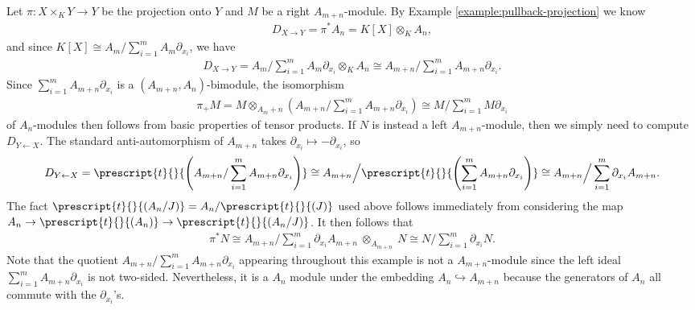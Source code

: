 \begin{example}\label{example:pushforward-projection}
	Let $\pi:X\times_K Y\to Y$ be the projection onto $Y$ and $M$ be a right $A_{m+n}$-module. By Example \ref{example:pullback-projection} we know
	\begin{align*}
		D_{X\to Y} = \pi^*A_n = K[X]\otimes_K A_n,
	\end{align*}
	and since $K[X] \cong A_m/\sum_{i=1}^m A_m\partial_{x_i}$, we have
	\begin{align*}
		D_{X\to Y} = A_m\Big/\sum_{i=1}^m A_m\partial_{x_i} \otimes_K A_n \cong A_{m+n}\Big/ \sum_{i=1}^{m} A_{m+n}\partial_{x_i}.
	\end{align*}
	Since $\sum_{i=1}^{m} A_{m+n}\partial_{x_i}$ is a $(A_{m+n}, A_n)$-bimodule, the isomorphism
	\begin{align*}
		\pi_+M = M\otimes_{A_m+n} \left(A_{m+n}\Big/ \sum_{i=1}^{m} A_{m+n}\partial_{x_i}\right) \cong M\Big/\sum_{i=1}^m M\partial_{x_i}
	\end{align*}
	of $A_n$-modules then follows from basic properties of tensor products. If $N$ is instead a left $A_{m+n}$-module, then we simply need to compute $D_{Y\leftarrow X}$. The standard anti-automorphism of $A_{m+n}$ takes $\partial_{x_i}\mapsto -\partial_{x_i}$, so
	\begin{align*}
		D_{Y\leftarrow X} = \prescript{t}{}{\left(A_{m+n}/ \sum_{i=1}^{m} A_{m+n}\partial_{x_i}\right)} \cong A_{m+n}\Big/\prescript{t}{}{\left(\sum_{i=1}^{m} A_{m+n}\partial_{x_i}\right)} \cong A_{m+n}\Big/\sum_{i=1}^{m} \partial_{x_i}A_{m+n}.
	\end{align*}
	The fact $\prescript{t}{}{(A_n/J)} = A_n/\prescript{t}{}{(J)}$ used above follows immediately from considering the map $A_n\to \prescript{t}{}{(A_n)}\to \prescript{t}{}{(A_n/J)}$. It then follows that
	\begin{align*}
		\pi^*N \cong A_{m+n}\Big/\sum_{i=1}^{m} \partial_{x_i}A_{m+n}~\otimes_{A_{m+n}} ~N \cong N\Big/\sum_{i=1}^m\partial_{x_i} N.
	\end{align*}
	Note that the quotient $A_{m+n}/ \sum_{i=1}^m A_{m+n}\partial_{x_i}$ appearing throughout this example is not a $A_{m+n}$-module since the left ideal $\sum_{i=1}^mA_{m+n}\partial_{x_i}$ is not two-sided. Nevertheless, it is a $A_n$ module under the embedding $A_n\hookrightarrow A_{m+n}$ because the generators of $A_n$ all commute with the $\partial_{x_i}$'s.
\end{example}

